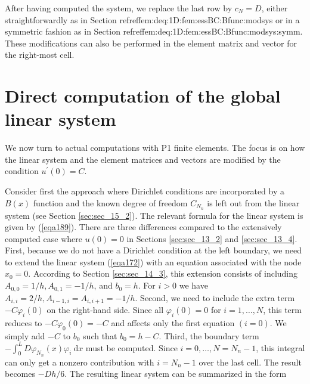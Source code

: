 \documentclass[../main.tex]{subfiles}
\begin{document}
		\noindent After having computed the system, we replace the last row by $c_{N}=D$, either straightforwardly as in Section refreffem:deq:1D:fem:essBC:Bfunc:modsys or in a symmetric fashion as in Section refreffem:deq:1D:fem:essBC:Bfunc:modsys:symm. These modifications can also be performed in the element matrix and vector for the right-most cell.
	
	\section[Direct computation of the global linear system]{Direct computation of the global linear system}
		\label{sec:sec_15_4}
		We now turn to actual computations with P1 finite elements. The focus is on how the linear system and the element matrices and vectors are modified by the condition $u^{\prime}(0)=C$.
		
		Consider first the approach where Dirichlet conditions are incorporated by a $B(x)$ function and the known degree of freedom $C_{N_{n}}$ is left out from the linear system (see Section \ref{sec:sec_15_2}). The relevant formula for the linear system is given by (\ref{eqa189}). There are three differences compared to the extensively computed case where $u(0)=0$ in Sections \ref{sec:sec_13_2} and \ref{sec:sec_13_4}. First, because we do not have a
		Dirichlet condition at the left boundary, we need to extend the linear system (\ref{eqa172}) with an equation associated with the node $x_{0}=0$. According to Section \ref{sec:sec_14_3}, this extension consists of including $A_{0,0}=1 / h, A_{0,1}=-1 / h$, and $b_{0}=h$. For $i>0$ we have $A_{i, i}=2 / h, A_{i-1, i}=A_{i, i+1}=-1 / h$. Second, we need to include the extra term $-C \varphi_{i}(0)$ on the right-hand side. Since all $\varphi_{i}(0)=0$ for $i=1, \ldots, N$, this term reduces to $-C \varphi_{0}(0)=-C$ and affects only the first equation $(i=0)$. We simply add $-C$ to $b_{0}$ such that $b_{0}=h-C$. Third, the boundary term $-\int_{0}^{L} D \varphi_{N_{n}}(x) \varphi_{i} \mathrm{~d} x$ must be computed. Since $i=0, \ldots, N=N_{n}-1$, this integral can only get a nonzero contribution with $i=N_{n}-1$ over the last cell. The result becomes $-D h / 6$. The resulting linear system can be summarized in the form
		
\end{document}
